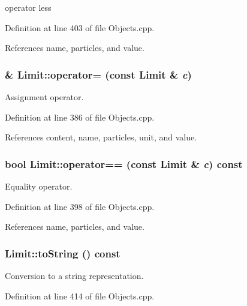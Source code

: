 operator less 

Definition at line 403 of file Objects.cpp.

References name, particles, and value.\hypertarget{class_d_d4hep_1_1_geometry_1_1_limit_a552afa647ac82252e601c3cd02d41e21}{
\subsubsection[{operator=}]{ \& Limit::operator= (const {\bf Limit} \& {\em c})}}
\label{class_d_d4hep_1_1_geometry_1_1_limit_a552afa647ac82252e601c3cd02d41e21}


Assignment operator. 

Definition at line 386 of file Objects.cpp.

References content, name, particles, unit, and value.\hypertarget{class_d_d4hep_1_1_geometry_1_1_limit_a02a35ca283850ec644b0453f69416537}{
\subsubsection[{operator==}]{\setlength{\rightskip}{0pt plus 5cm}bool Limit::operator== (const {\bf Limit} \& {\em c}) const}}
\label{class_d_d4hep_1_1_geometry_1_1_limit_a02a35ca283850ec644b0453f69416537}


Equality operator. 

Definition at line 398 of file Objects.cpp.

References name, particles, and value.\hypertarget{class_d_d4hep_1_1_geometry_1_1_limit_a4457a562ae609ecb9dcec740d7270e89}{
\subsubsection[{toString}]{ Limit::toString () const}}
\label{class_d_d4hep_1_1_geometry_1_1_limit_a4457a562ae609ecb9dcec740d7270e89}


Conversion to a string representation. 

Definition at line 414 of file Objects.cpp.

